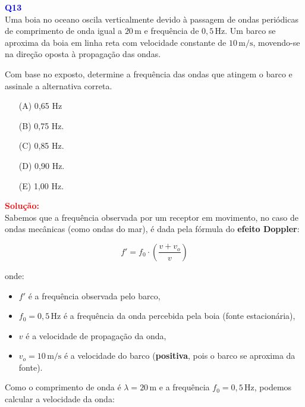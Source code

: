 \documentclass[a4paper,12pt]{article}
\begin{document}
\begin{flushleft}
\textbf{\textcolor{blue}{\Large Q13}}\\
Uma boia no oceano oscila verticalmente devido à passagem de ondas periódicas de comprimento de onda 
igual a \(20\,\text{m}\) e frequência de \(0{,}5\,\text{Hz}\). Um barco se aproxima da boia em linha 
reta com velocidade constante de \(10\,\text{m/s}\), movendo-se na direção oposta à propagação das ondas.

Com base no exposto, determine a frequência das ondas que atingem o barco e assinale a alternativa correta.

\begin{itemize}
\item[(A)] 0{,}65 Hz 
\item[(B)] 0{,}75 Hz.
\item[(C)] 0{,}85 Hz.
\item[(D)] 0{,}90 Hz.
\item[(E)] 1,00 Hz.
\end{itemize}

\vspace{0.5cm}

\textcolor{red}{\textbf{Solução:}}\\

\noindent
Sabemos que a frequência observada por um receptor em movimento, no caso de \colorbox{yellow!20}{ondas} \colorbox{yellow!20}{mecânicas (como ondas do mar), 
é dada pela fórmula do \textbf{efeito Doppler}:}

\begin{equation}
f' = f_0 \cdot \left( \frac{v + v_o}{v} \right)
\end{equation}

\noindent
onde:
\begin{itemize}
  \item \( f' \) é a frequência observada pelo barco,
  \item \( f_0 = 0{,}5\,\text{Hz} \) é a frequência da onda percebida pela boia (fonte estacionária),
  \item \( v \) é a velocidade de propagação da onda,
  \item \( v_o = 10\,\text{m/s} \) é a velocidade do barco (\textbf{positiva}, pois o barco se aproxima da fonte).
\end{itemize}

\noindent
Como o comprimento de onda é \( \lambda = 20\,\text{m} \) e a frequência \( f_0 = 0{,}5\,\text{Hz} \), podemos calcular a velocidade da onda:


\end{flushleft}
\end{document}
